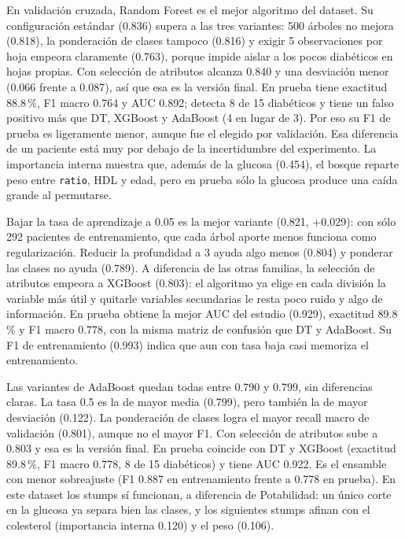 En validación cruzada, Random Forest es el mejor algoritmo del dataset. Su
configuración estándar (0.836) supera a las tres variantes: 500 árboles no mejora
(0.818), la ponderación de clases tampoco (0.816) y exigir 5 observaciones por hoja
empeora claramente (0.763), porque impide aislar a los pocos diabéticos en hojas
propias. Con selección de atributos alcanza 0.840 y una desviación menor (0.066 frente
a 0.087), así que esa es la versión final. En prueba tiene exactitud 88.8\,\%, F1
macro 0.764 y AUC 0.892; detecta 8 de 15 diabéticos y tiene un falso positivo más que
DT, XGBoost y AdaBoost (4 en lugar de 3). Por eso su F1 de prueba es ligeramente menor,
aunque fue el elegido por validación. Esa diferencia de un paciente está muy por debajo
de la incertidumbre del experimento. La importancia interna muestra que, además de la
glucosa (0.454), el bosque reparte peso entre \texttt{ratio}, HDL y edad, pero en
prueba sólo la glucosa produce una caída grande al permutarse.

Bajar la tasa de aprendizaje a 0.05 es la mejor variante (0.821, +0.029): con sólo 292
pacientes de entrenamiento, que cada árbol aporte menos funciona como regularización.
Reducir la profundidad a 3 ayuda algo menos (0.804) y ponderar las clases no ayuda
(0.789). A diferencia de las otras familias, la selección de atributos empeora a XGBoost
(0.803): el algoritmo ya elige en cada división la variable más útil y quitarle
variables secundarias le resta poco ruido y algo de información. En prueba obtiene la
mejor AUC del estudio (0.929), exactitud 89.8\,\% y F1 macro 0.778, con la misma matriz
de confusión que DT y AdaBoost. Su F1 de entrenamiento (0.993) indica que aun con tasa
baja casi memoriza el entrenamiento.

Las variantes de AdaBoost quedan todas entre 0.790 y 0.799, sin diferencias claras. La
tasa 0.5 es la de mayor media (0.799), pero también la de mayor desviación (0.122). La
ponderación de clases logra el mayor recall macro de validación (0.801), aunque no el
mayor F1. Con selección de atributos sube a 0.803 y esa es la versión final. En prueba
coincide con DT y XGBoost (exactitud 89.8\,\%, F1 macro 0.778, 8 de 15 diabéticos) y
tiene AUC 0.922. Es el ensamble con menor sobreajuste (F1 0.887 en entrenamiento frente
a 0.778 en prueba). En este dataset los stumps sí funcionan, a diferencia de
Potabilidad: un único corte en la glucosa ya separa bien las clases, y los siguientes
stumps afinan con el colesterol (importancia interna 0.120) y el peso (0.106).

